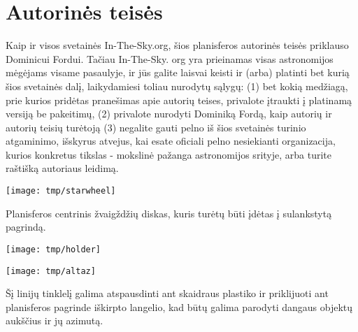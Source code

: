 \documentclass[a4paper,onecolumn,10pt]{article}
\begin{document}
\section*{Autorinės teisės}

Kaip ir visos svetainės In-The-Sky.org, šios planisferos autorinės teisės priklauso Dominicui Fordui. Tačiau In-The-Sky. org yra prieinamas visas astronomijos mėgėjams visame pasaulyje, ir jūs galite laisvai keisti ir (arba) platinti bet kurią šios svetainės dalį, laikydamiesi toliau nurodytų sąlygų: (1) bet kokią medžiagą, prie kurios pridėtas pranešimas apie autorių teises, privalote įtraukti į platinamą versiją be pakeitimų, (2) privalote nurodyti Dominiką Fordą, kaip autorių ir autorių teisių turėtoją (3) negalite gauti pelno iš šios svetainės turinio atgaminimo, išskyrus atvejus, kai esate oficiali pelno nesiekianti organizacija, kurios konkretus tikslas - mokslinė pažanga astronomijos srityje, arba turite raštišką autoriaus leidimą.

\newpage

\centerline{\texttt{[image: tmp/starwheel]}}

\vspace{1cm}
Planisferos centrinis žvaigždžių diskas, kuris turėtų būti įdėtas į sulankstytą pagrindą.

\newpage
\thispagestyle{empty}
\vspace*{-3.0cm}
\centerline{\texttt{[image: tmp/holder]}}
\newpage

\centerline{\texttt{[image: tmp/altaz]}}

\vspace{1cm}
Šį linijų tinklelį galima atspausdinti ant skaidraus plastiko ir priklijuoti ant planisferos pagrinde iškirpto langelio, kad būtų galima parodyti dangaus objektų aukščius ir jų azimutą.
\end{document}
